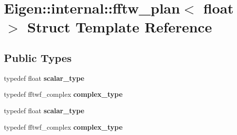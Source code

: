 \hypertarget{struct_eigen_1_1internal_1_1fftw__plan_3_01float_01_4}{}\section{Eigen\+:\+:internal\+:\+:fftw\+\_\+plan$<$ float $>$ Struct Template Reference}
\label{struct_eigen_1_1internal_1_1fftw__plan_3_01float_01_4}
\subsection*{Public Types}
\begin{DoxyCompactItemize}
\item 
\mbox{\label{struct_eigen_1_1internal_1_1fftw__plan_3_01float_01_4_a007a59683cdeda85084438dbc25fbc2d}} 
typedef float {\bfseries scalar\+\_\+type}
\item 
\mbox{\label{struct_eigen_1_1internal_1_1fftw__plan_3_01float_01_4_ae53b9a38713d59bf7915148d976db05b}} 
typedef fftwf\+\_\+complex {\bfseries complex\+\_\+type}
\item 
\mbox{\label{struct_eigen_1_1internal_1_1fftw__plan_3_01float_01_4_a007a59683cdeda85084438dbc25fbc2d}} 
typedef float {\bfseries scalar\+\_\+type}
\item 
\mbox{\label{struct_eigen_1_1internal_1_1fftw__plan_3_01float_01_4_ae53b9a38713d59bf7915148d976db05b}} 
typedef fftwf\+\_\+complex {\bfseries complex\+\_\+type}
\end{DoxyCompactItemize}
